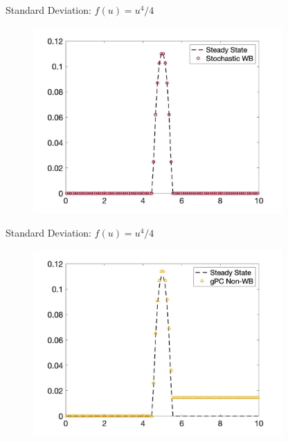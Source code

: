 \documentclass[
    pdf,
    11pt,
    xcolor={svgnames},
  ]{beamer}
\begin{document}
\begin{frame}{Standard Deviation: $f(u) = u^4 / 4$}
    \begin{figure}
    \centering
    \includegraphics[width=0.85\textwidth]{./Figures/u4_wb_sd}
    \end{figure}
\end{frame}
\begin{frame}{Standard Deviation: $f(u) = u^4 / 4$}
    \begin{figure}
    \centering
    \includegraphics[width=0.85\textwidth]{./Figures/u4_non_sd}
    \end{figure}
\end{frame}

\end{document}
